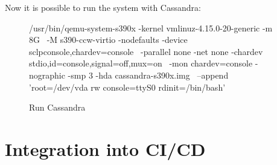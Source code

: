 Now it is possible to run the system with Cassandra: \\
\begin{figure}[H]
\centering
\begin{boxedverbatim}
 /usr/bin/qemu-system-s390x -kernel vmlinuz-4.15.0-20-generic -m 8G \
 -M s390-ccw-virtio -nodefaults -device sclpconsole,chardev=console \
 -parallel none -net none -chardev stdio,id=console,signal=off,mux=on \
 -mon chardev=console -nographic -smp 3 -hda cassandra-s390x.img \ 
 --append 'root=/dev/vda rw console=ttyS0 rdinit=/bin/bash' 
\end{boxedverbatim}
 \caption{Run Cassandra}
    \label{RunCassandra}
\end{figure}

\newpage
\section{Integration into CI/CD}

